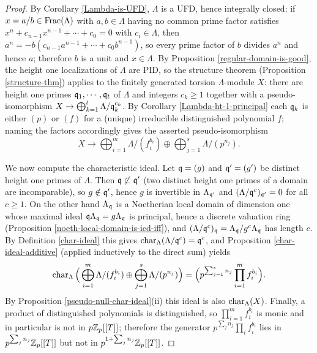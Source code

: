 \begin{proof}
By Corollary \ref{Lambda-is-UFD}, $\Lambda$ is a UFD, hence integrally closed:
if $x=a/b\in{\mathrm{Frac}}(\Lambda)$ with $a,b\in\Lambda$ having no common prime factor
satisfies $x^n+c_{n-1}x^{n-1}+\cdots+c_0=0$ with $c_i\in\Lambda$, then
$a^n=-b(c_{n-1}a^{n-1}+\cdots+c_0b^{n-1})$, so every prime factor of $b$ divides
$a^n$ and hence $a$; therefore $b$ is a unit and $x\in\Lambda$.
By Proposition \ref{regular-domain-is-good}, the height one localizations of
$\Lambda$ are PID, so the structure theorem (Proposition \ref{structure-thm})
applies to the finitely generated torsion $\Lambda$-module $X$: there are height
one primes ${\mathfrak{q}}_1,\cdots,{\mathfrak{q}}_t$ of $\Lambda$ and integers $c_k\geq 1$ together
with a pseudo-isomorphism $X\to\bigoplus_{k=1}^t\Lambda/{\mathfrak{q}}_k^{c_k}$.
By Corollary \ref{Lambda-ht-1-principal} each ${\mathfrak{q}}_k$ is either $(p)$ or $(f)$
for a (unique) irreducible distinguished polynomial $f$; naming the factors
accordingly gives the asserted pseudo-isomorphism
$$X\to\bigoplus_{i=1}^m\Lambda/(f_i^{b_i})\oplus\bigoplus_{j=1}^s\Lambda/(p^{n_j}).$$

We now compute the characteristic ideal.
Let ${\mathfrak{q}}=(g)$ and ${\mathfrak{q}}'=(g')$ be distinct height one primes of $\Lambda$.
Then ${\mathfrak{q}}\not\subset{\mathfrak{q}}'$ (two distinct height one primes of a domain are
incomparable), so $g\notin{\mathfrak{q}}'$, hence $g$ is invertible in $\Lambda_{{\mathfrak{q}}'}$ and
$(\Lambda/{\mathfrak{q}}^c)_{{\mathfrak{q}}'}=0$ for all $c\geq 1$.
On the other hand $\Lambda_{\mathfrak{q}}$ is a Noetherian local domain of dimension one
whose maximal ideal ${\mathfrak{q}}\Lambda_{\mathfrak{q}}=g\Lambda_{\mathfrak{q}}$ is principal, hence a discrete
valuation ring (Proposition \ref{noeth-local-domain-is-icd-iff}), and
$(\Lambda/{\mathfrak{q}}^c)_{\mathfrak{q}}=\Lambda_{\mathfrak{q}}/g^c\Lambda_{\mathfrak{q}}$ has length $c$.
By Definition \ref{char-ideal} this gives $\operatorname{char}_\Lambda(\Lambda/{\mathfrak{q}}^c)={\mathfrak{q}}^c$,
and Proposition \ref{char-ideal-additive} (applied inductively to the direct sum)
yields
$$\operatorname{char}_\Lambda\Big(\bigoplus_{i=1}^m\Lambda/(f_i^{b_i})
\oplus\bigoplus_{j=1}^s\Lambda/(p^{n_j})\Big)
=\Big(p^{\sum_{j=1}^sn_j}\prod_{i=1}^mf_i^{b_i}\Big).$$
By Proposition \ref{pseudo-null-char-ideal}(ii) this ideal is also
$\operatorname{char}_\Lambda(X)$.
Finally, a product of distinguished polynomials is distinguished, so
$\prod_{i=1}^mf_i^{b_i}$ is monic and in particular is not in $p{\mathbb {Z}}_p[[T]]$;
therefore the generator $p^{\sum_jn_j}\prod_if_i^{b_i}$ lies in
$p^{\sum_jn_j}{\mathbb {Z}}_p[[T]]$ but not in $p^{1+\sum_jn_j}{\mathbb {Z}}_p[[T]]$.
\end{proof}

